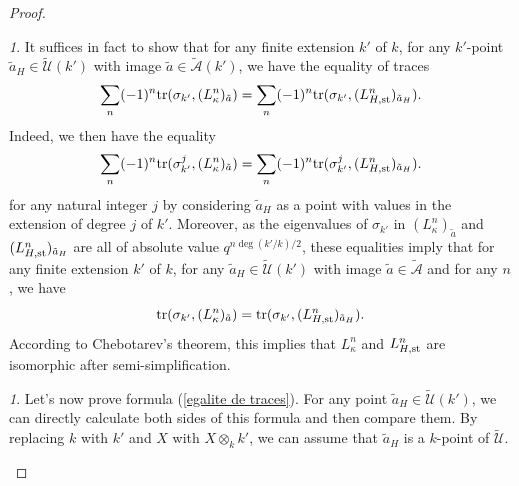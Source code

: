 \documentclass[12pt,english]{smfart}
\numberwithin{equation}{subsection}
\theoremstyle{remark}
\newtheorem{numero}[equation]{}
\newcommand\calA{{\mathscr A}}
\newcommand\calU{{\mathscr U}}
\newcommand\tr{{\rm tr}}
\begin{document}
\begin{proof}
\begin{numero}
It suffices in fact to show that for any finite extension $k'$ of $k$,
for any $k'$-point $\tilde a_H\in \tilde\calU(k')$ with image $\tilde
a\in\tilde\calA(k')$, we have the equality of traces
\begin{equation}\label{egalite de traces}
\sum_{n} (-1)^{n}\tr(\sigma_{k'},(L^n_\kappa)_{\tilde a}) \\
=\sum_{n} (-1)^{n} \tr(\sigma_{k'},(L^n_{H,{\rm st}})_{\tilde a_H}).
\end{equation}
Indeed, we then have the equality
$$
\sum_{n} (-1)^{n}\tr(\sigma_{k'}^j,(L^n_\kappa)_{\tilde a}) \\
=\sum_{n} (-1)^{n} \tr(\sigma_{k'}^j,(L^n_{H,{\rm st}})_{\tilde a_H}).
$$
for any natural integer $j$ by considering $\tilde a_H$ as a point
with values in the extension of degree $j$ of $k'$. Moreover, as the
eigenvalues of $\sigma_{k'}$ in $(L^n_\kappa)_{\tilde a}$ and
$(L^n_{H,{\rm st}})_{\tilde a_H}$ are all of absolute value
$q^{n\deg(k'/ k)/ 2}$, these equalities imply that for any finite extension
$k'$ of $k$, for any $\tilde a_H\in \tilde\calU(k')$ with image $\tilde
a\in \tilde\calA$ and for any $n$, we have
$$\tr(\sigma_{k'},(L^n_\kappa)_{\tilde a})=\tr(\sigma_{k'},(L^n_{H,{\rm
st}})_{\tilde a_H}).$$ According to Chebotarev's theorem, this
implies that $L^n_\kappa$ and $L^n_{H,{\rm st}}$ are isomorphic after
semi-simplification.
\end{numero}

\begin{numero}
Let's now prove formula (\ref{egalite de traces}). For any
point $\tilde a_H \in\tilde\calU(k')$, we can directly calculate both
sides of this formula and then compare them. By replacing $k$
with $k'$ and $X$ with $X\otimes_k k'$, we can assume that $\tilde a_H$ is
a $k$-point of $\tilde\calU$.
\end{numero}


\end{proof}
\end{document}
